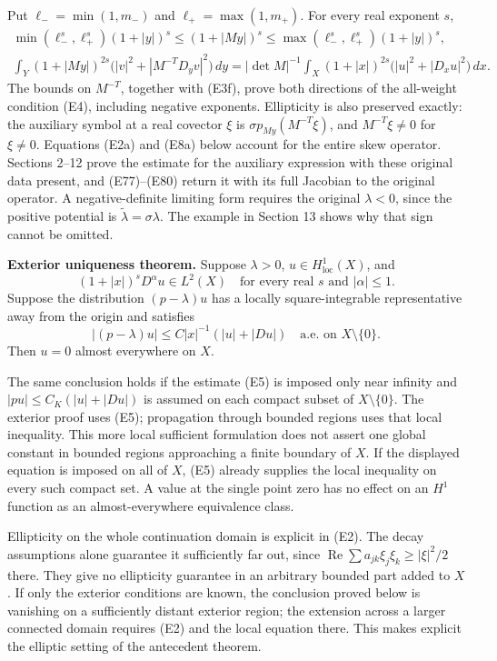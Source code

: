 \documentclass[
  11pt,
]{article}
\begin{document}
Put \(\ell_- =\min(1,m_-)\) and \(\ell_+=\max(1,m_+)\). For every real
exponent \(s\), \[
 \begin{gathered}
 \min(\ell_-^s,\ell_+^s)(1+|y|)^s
 \leq(1+|My|)^s
 \leq\max(\ell_-^s,\ell_+^s)(1+|y|)^s,\\
 \int_Y(1+|My|)^{2s}
             \bigl(|v|^2+|M^{-T}D_yv|^2\bigr)\,dy
 =|\det M|^{-1}\int_X(1+|x|)^{2s}
             \bigl(|u|^2+|D_xu|^2\bigr)\,dx.
 \end{gathered}                                                   \tag{E3f}
\] The bounds on \(M^{-T}\), together with (E3f), prove both directions
of the all-weight condition (E4), including negative exponents.
Ellipticity is also preserved exactly: the auxiliary symbol at a real
covector \(\xi\) is \(\sigma p_{My}(M^{-T}\xi)\), and \(M^{-T}\xi\ne0\)
for \(\xi\ne0\). Equations (E2a) and (E8a) below account for the entire
skew operator. Sections 2--12 prove the estimate for the auxiliary
expression with these original data present, and (E77)--(E80) return it
with its full Jacobian to the original operator. A negative-definite
limiting form requires the original \(\lambda<0\), since the positive
potential is \(\widetilde\lambda=\sigma\lambda\). The example in Section
13 shows why that sign cannot be omitted.

\textbf{Exterior uniqueness theorem.} Suppose \(\lambda>0\),
\(u\in H^1_{\mathrm{loc}}(X)\), and \[
 (1+|x|)^s D^\alpha u\in L^2(X)
 \quad\text{for every real }s\text{ and }|\alpha|\leq1.           \tag{E4}
\] Suppose the distribution \((p-\lambda)u\) has a locally
square-integrable representative away from the origin and satisfies \[
 |(p-\lambda)u|\leq C|x|^{-1}(|u|+|Du|)
 \quad\text{a.e. on }X\setminus\{0\}.                           \tag{E5}
\] Then \(u=0\) almost everywhere on \(X\).

The same conclusion holds if the estimate (E5) is imposed only near
infinity and \(|pu|\leq C_K(|u|+|Du|)\) is assumed on each compact
subset of \(X\setminus\{0\}\). The exterior proof uses (E5); propagation
through bounded regions uses that local inequality. This more local
sufficient formulation does not assert one global constant in bounded
regions approaching a finite boundary of \(X\). If the displayed
equation is imposed on all of \(X\), (E5) already supplies the local
inequality on every such compact set. A value at the single point zero
has no effect on an \(H^1\) function as an almost-everywhere equivalence
class.

Ellipticity on the whole continuation domain is explicit in (E2). The
decay assumptions alone guarantee it sufficiently far out, since
\(\operatorname{Re}\sum a_{jk}\xi_j\xi_k\geq |\xi|^2/2\) there. They
give no ellipticity guarantee in an arbitrary bounded part added to
\(X\). If only the exterior conditions are known, the conclusion proved
below is vanishing on a sufficiently distant exterior region; the
extension across a larger connected domain requires (E2) and the local
equation there. This makes explicit the elliptic setting of the
antecedent theorem.
\end{document}
